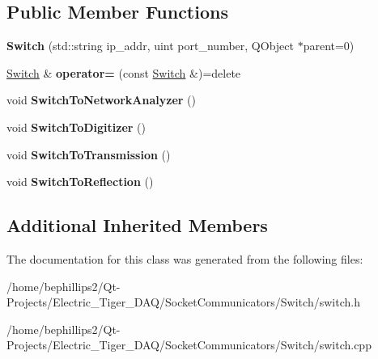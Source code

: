 \subsection*{Public Member Functions}
\begin{DoxyCompactItemize}
\item 
{\bfseries Switch} (std\+::string ip\+\_\+addr, uint port\+\_\+number, Q\+Object $\ast$parent=0)\hypertarget{class_switch_a65000fb5fb00f6833ec685175be47027}{}\label{class_switch_a65000fb5fb00f6833ec685175be47027}

\item 
\hyperlink{class_switch}{Switch} \& {\bfseries operator=} (const \hyperlink{class_switch}{Switch} \&)=delete\hypertarget{class_switch_a5d75382f2acb13883c3ef60d8b2aef7d}{}\label{class_switch_a5d75382f2acb13883c3ef60d8b2aef7d}

\item 
void {\bfseries Switch\+To\+Network\+Analyzer} ()\hypertarget{class_switch_a88b6be045896b8946be86202dc4c97e3}{}\label{class_switch_a88b6be045896b8946be86202dc4c97e3}

\item 
void {\bfseries Switch\+To\+Digitizer} ()\hypertarget{class_switch_a004bbaf7459b48549f87f7b26e9353ed}{}\label{class_switch_a004bbaf7459b48549f87f7b26e9353ed}

\item 
void {\bfseries Switch\+To\+Transmission} ()\hypertarget{class_switch_a9671dbed18c34b5e0e4c8961004d150e}{}\label{class_switch_a9671dbed18c34b5e0e4c8961004d150e}

\item 
void {\bfseries Switch\+To\+Reflection} ()\hypertarget{class_switch_abe4a4b4754fdb4979ddfa3a10fc9e127}{}\label{class_switch_abe4a4b4754fdb4979ddfa3a10fc9e127}

\end{DoxyCompactItemize}
\subsection*{Additional Inherited Members}


The documentation for this class was generated from the following files\+:\begin{DoxyCompactItemize}
\item 
/home/bephillips2/\+Qt-\/\+Projects/\+Electric\+\_\+\+Tiger\+\_\+\+D\+A\+Q/\+Socket\+Communicators/\+Switch/switch.\+h\item 
/home/bephillips2/\+Qt-\/\+Projects/\+Electric\+\_\+\+Tiger\+\_\+\+D\+A\+Q/\+Socket\+Communicators/\+Switch/switch.\+cpp\end{DoxyCompactItemize}
